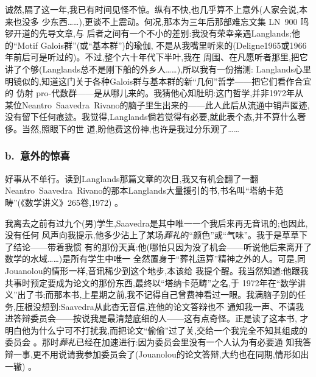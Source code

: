 诚然,隔了这一年,我已有时间见怪不惊。纵有不快,也几乎算不上意外(人家会说,本来也没多
少东西……),更谈不上震动。何况,那本为三年后那部难忘文集 LN~900 鸣锣开道的先导文章,与
后者之间有一个不小的差别:我没有荣幸亲遇Langlands;他的“Motif Galois群”(或“基本群”)的瑜伽,
不是从我嘴里听来的(Deligne1965或1966年前后可是听过的)。不过,整个六十年代下半叶,我在
周围、在凡愿听者那里,把它讲了个够(Langlands总不是刚下船的外乡人……),所以我有一份揣测:
Langlands心里明镜似的,知道这门关于各种Galois群与基本群的新“几何”哲学——把它们看作合宜的
仿射 pro-代数群——是从哪儿来的。我猜他心知肚明:这门哲学,并非1972年从某位Neantro~Saavedra~Rivano的脑子里生出来的——此人此后从流通中销声匿迹,没有留下任何痕迹。我觉得,Langlands倘若觉得有必要,就此表个态,并不算什么奢侈。当然,照眼下的世
道,盼他费这份神,也许是我过分乐观了……

\subsubsection{b.\ 意外的惊喜}


\pmark{}好事从不单行。读到Langlands那篇文章的次日,我又有机会翻了一翻Neantro~Saavedra~Rivano的那本Langlands大量援引的书,书名叫“塔纳卡范畴”(《数学讲义》265卷,1972)
。

我离去之前有过九个(男)学生,Saavedra是其中唯一一个我后来再无音讯的;也因此,没有任何
风声向我提示,他多少沾上了某场\emph{葬礼}的“颜色”或“气味”。我于是草草下了结论——带着我惯
有的那份天真:他(哪怕只因为没了机会——听说他后来离开了数学的水域……)是所有学生中唯一
全然置身于“葬礼运算”精神之外的人。可是,同Jouanolou的情形一样,音讯稀少到这个地步,本该给
我提个醒。我当然知道:他跟我共事时预定要成为论文的那份东西,最终以“塔纳卡范畴”之名,于
1972年在“数学讲义”出了书;而那本书,上星期之前,我不记得自己曾费神看过一眼。我满脑子别的任务,压根没想到:Saavedra从此杳无音信,连他的论文答辩也不
通知我一声、不请我进答辩委员会——按说我是最清楚底细的人——这有点奇怪。正是读了这本书,
才明白他为什么宁可不打扰我,而把论文“偷偷”过了关,交给一个我完全不知其组成的委员会
。那时\emph{葬礼}已经在加速进行:因为委员会里没有一个人认为有必要通
知我答辩一事,更不用说请我参加委员会了(Jouanolou的论文答辩,大约也在同期,情形如出一辙)
。

